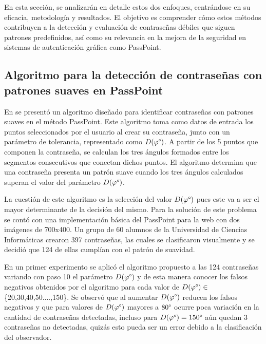 \documentclass[12pt]{report}
\begin{document}
	En esta sección, se analizarán en detalle estos dos enfoques, centrándose en su eficacia, metodología y resultados. El objetivo es comprender cómo estos métodos contribuyen a la detección y evaluación de contraseñas débiles que siguen patrones predefinidos, así como su relevancia en la mejora de la seguridad en sistemas de autenticación gráfica como PassPoint.

\subsection{Algoritmo para la detección de contraseñas con patrones suaves en PassPoint}

En \cite{3} se presentó un algoritmo diseñado para identificar contraseñas con patrones suaves en el método PassPoint. Este algoritmo toma como datos de entrada los puntos seleccionados por el usuario al crear su contraseña, junto con un parámetro de tolerancia, representado como $D(\varphi\degree)$. A partir de los 5 puntos que componen la contraseña, se calculan los tres ángulos formados entre los segmentos consecutivos que conectan dichos puntos. El algoritmo determina que una contraseña presenta un patrón suave cuando los tres ángulos calculados superan el valor del parámetro $D(\varphi\degree)$.

La cuestión de este algoritmo es la selección del valor $D(\varphi\degree)$ pues este va a ser el mayor determinante de la decisión del mismo. Para la solución de este problema se contó con una implementación básica del PassPoint para la web con dos imágenes de 700x400. Un grupo de 60 alumnos de la Universidad de Ciencias Informáticas crearon 397 contraseñas, las cuales se clasificaron visualmente y se decidió que 124 de ellas cumplían con el patrón de suavidad. 

En un primer experimento se aplicó el algoritmo propuesto a las 124 contraseñas variando con paso 10 el parámetro $D(\varphi\degree)$ y de esta manera conocer los falsos negativos obtenidos por el algoritmo para cada valor de $D(\varphi\degree)\in$ \{20,30,40,50....,150\}. Se observó que al aumentar $D(\varphi\degree)$ reducen los falsos negativos y que para valores de $D(\varphi\degree)$ mayores a $80\degree$  ocurre poca variación en la cantidad de contraseñas detectadas, incluso para $D(\varphi\degree)=150\degree$  aún quedan 3 contraseñas no detectadas, quizás esto pueda ser un error debido a la clasificación del observador.
\end{document}
